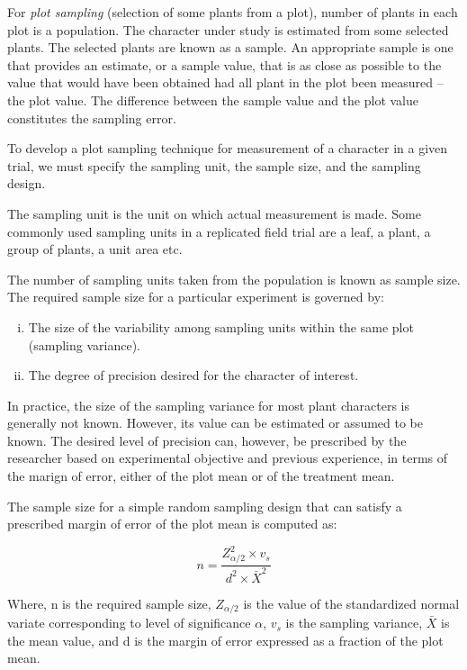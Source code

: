 \documentclass[
  ignorenonframetext,
  aspectratio=169]{beamer}
\providecommand{\tightlist}{%
  \setlength{\itemsep}{0pt}\setlength{\parskip}{0pt}}
\begin{document}
\begin{frame}{}
\protect\hypertarget{section-9}{}
For \emph{plot sampling} (selection of some plants from a plot), number
of plants in each plot is a population. The character under study is
estimated from some selected plants. The selected plants are known as a
sample. An appropriate sample is one that provides an estimate, or a
sample value, that is as close as possible to the value that would have
been obtained had all plant in the plot been measured -- the plot value.
The difference between the sample value and the plot value constitutes
the sampling error.

To develop a plot sampling technique for measurement of a character in a
given trial, we must specify the sampling unit, the sample size, and the
sampling design.
\end{frame}

\begin{frame}{}
\protect\hypertarget{section-10}{}
The sampling unit is the unit on which actual measurement is made. Some
commonly used sampling units in a replicated field trial are a leaf, a
plant, a group of plants, a unit area etc.

The number of sampling units taken from the population is known as
sample size. The required sample size for a particular experiment is
governed by:

\begin{enumerate}
[i.]
\tightlist
\item
  The size of the variability among sampling units within the same plot
  (sampling variance).
\item
  The degree of precision desired for the character of interest.
\end{enumerate}

In practice, the size of the sampling variance for most plant characters
is generally not known. However, its value can be estimated or assumed
to be known. The desired level of precision can, however, be prescribed
by the researcher based on experimental objective and previous
experience, in terms of the marign of error, either of the plot mean or
of the treatment mean.
\end{frame}

\begin{frame}{}
\protect\hypertarget{section-11}{}
The sample size for a simple random sampling design that can satisfy a
prescribed margin of error of the plot mean is computed as:

\[
n = \frac{Z_{\alpha/2}^2 \times v_s}{d^2 \times \bar{X}^2}
\]

Where, n is the required sample size, \(Z_{\alpha/2}\) is the value of
the standardized normal variate corresponding to level of significance
\(\alpha\), \(v_s\) is the sampling variance, \(\bar{X}\) is the mean
value, and d is the margin of error expressed as a fraction of the plot
mean.
\end{frame}
\end{document}
